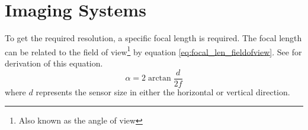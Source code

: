 \section{Imaging Systems}
\label{sec:ground_res}
To get the required resolution, a specific focal length is required. The focal length can be related to the field of view\footnote{Also known as the angle of view} by equation \eqref{eq:focal_len_fieldofview}. See \cite{wiki_aov2016} for derivation of this equation.
\begin{equation}
\label{eq:focal_len_fieldofview}
\alpha = 2\arctan{\frac{d}{2f}}
\end{equation}
where $d$ represents the sensor size in either the horizontal or vertical direction.

